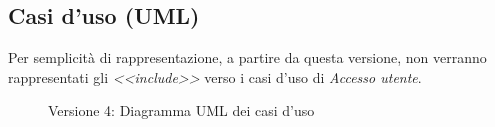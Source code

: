 \subsection{Casi d'uso (UML)}
\vspace{0.5cm}
Per semplicità di rappresentazione, a partire da questa versione, non verranno rappresentati gli \textit{<<include>>} verso i casi d'uso di \textit{Accesso utente}.
\begin{figure}[H]
    \centering
    \caption{Versione 4: Diagramma UML dei casi d'uso}
    \label{fig:use_case_uml_v4}
\end{figure}

